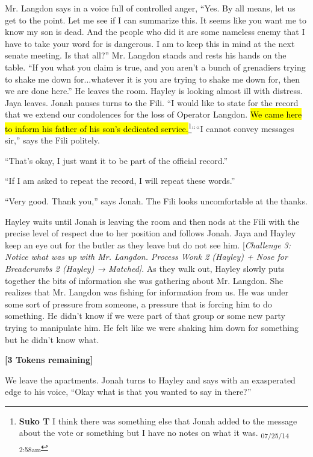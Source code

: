 Mr. Langdon says in a voice full of controlled anger, ``Yes. By all means, let us get to the point.  Let me see if I can summarize this.  It seems like you want me to know my son is dead.  And the people who did it are some nameless enemy that I have to take your word for is dangerous.  I am to keep this in mind at the next senate meeting.  Is that all?''  Mr. Langdon stands and rests his hands on the table.  ``If you what you claim is true, and you aren't a bunch of grenadiers trying to shake me down for...whatever it is you are trying to shake me down for, then we are done here.''  He leaves the room.  Hayley is looking almost ill with distress.  Jaya leaves.  Jonah pauses turns to the Fili.  ``I would like to state for the record that we extend our condolences for the loss of Operator Langdon.  \hl{We came here to inform his father of his son's dedicated service.}\footnote{\textbf{Suko T }I think there was something else that Jonah added to the message about the vote or something but I have no notes on what it was. \textsubscript{07/25/14 2:58am}}````I cannot convey messages sir,'' says the Fili politely.

``That's okay, I just want it to be part of the official record.''

``If I am asked to repeat the record, I will repeat these words.''

``Very good.  Thank you,'' says Jonah.  The Fili looks uncomfortable at the thanks.

Hayley waits until Jonah is leaving the room and then nods at the Fili with the precise level of respect due to her position and follows Jonah.  Jaya and Hayley keep an eye out for the butler as they leave but do not see him.  {[}\textit{Challenge 3: Notice what was up with Mr. Langdon.  Process Wonk 2 (Hayley) + Nose for Breadcrumbs 2 (Hayley) → Matched{]}}. As they walk out, Hayley slowly puts together the bits of information she was gathering about Mr. Langdon.  She realizes that Mr. Langdon was fishing for information from us.  He was under some sort of pressure from someone, a pressure that is forcing him to do something.  He didn't know if we were part of that group or some new party trying to manipulate him.  He felt like we were shaking him down for something but he didn't know what.



\textbf{{[}3 Tokens remaining{]}}



We leave the apartments.  Jonah turns to Hayley and says with an exasperated edge to his voice, ``Okay what is that you wanted to say in there?''

